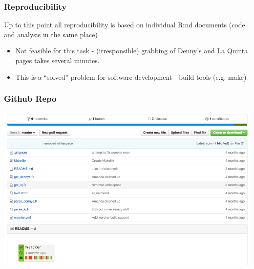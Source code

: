 \documentclass[12pt]{beamer}
\begin{document}
\begin{frame}[t]
\frametitle{Reproducibility}

{\small
Up to this point all reproducibility is based on individual Rmd documents (code and analysis in the same place)

\begin{itemize}
\pause \item Not feasible for this task - (irresponsible) grabbing of Denny's and La Quinta pages takes several minutes.

\pause \item This is a ``solved'' problem for software development - build tools (e.g. make)
\end{itemize}
}

\pause

\vspace{-2mm}

\end{frame}



\begin{frame}
\frametitle{Github Repo}

\includegraphics[width=\textwidth]{imgs/github_repo.png}
    
\end{frame}
\end{document}
